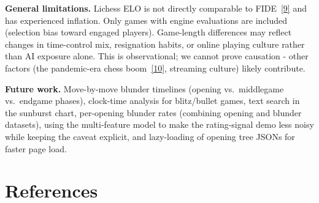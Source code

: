 \documentclass[a4paper]{article}
\begin{document}
\textbf{General limitations.}
Lichess ELO is not directly comparable to FIDE~\hyperlink{ref9}{[9]} and has experienced inflation. Only games with engine evaluations are included (selection bias toward engaged players). Game-length differences may reflect changes in time-control mix, resignation habits, or online playing culture rather than AI exposure alone. This is observational; we cannot prove causation - other factors (the pandemic-era chess boom~\hyperlink{ref10}{[10]}, streaming culture) likely contribute.

\textbf{Future work.}
Move-by-move blunder timelines (opening vs.\ middlegame vs.\ endgame phases), clock-time analysis for blitz/bullet games, text search in the sunburst chart, per-opening blunder rates (combining opening and blunder datasets), using the multi-feature model to make the rating-signal demo less noisy while keeping the caveat explicit, and lazy-loading of opening tree JSONs for faster page load.


\section*{References}
\end{document}
